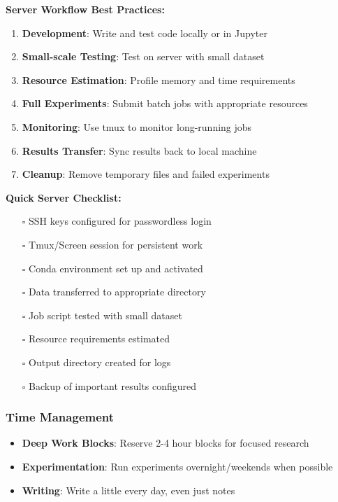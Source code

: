 \documentclass[11pt,a4paper]{article}
\begin{document}
\textbf{Server Workflow Best Practices:}

\begin{tcolorbox}[colback=green!5,colframe=green!50,title={\faLightbulb~Recommended Workflow}]
\begin{enumerate}
    \item \textbf{Development}: Write and test code locally or in Jupyter
    \item \textbf{Small-scale Testing}: Test on server with small dataset
    \item \textbf{Resource Estimation}: Profile memory and time requirements
    \item \textbf{Full Experiments}: Submit batch jobs with appropriate resources
    \item \textbf{Monitoring}: Use tmux to monitor long-running jobs
    \item \textbf{Results Transfer}: Sync results back to local machine
    \item \textbf{Cleanup}: Remove temporary files and failed experiments
\end{enumerate}
\end{tcolorbox}

\textbf{Quick Server Checklist:}

\begin{itemize}
    \item[$\square$] SSH keys configured for passwordless login
    \item[$\square$] Tmux/Screen session for persistent work
    \item[$\square$] Conda environment set up and activated
    \item[$\square$] Data transferred to appropriate directory
    \item[$\square$] Job script tested with small dataset
    \item[$\square$] Resource requirements estimated
    \item[$\square$] Output directory created for logs
    \item[$\square$] Backup of important results configured
\end{itemize}

\subsubsection{Time Management}
\begin{itemize}
    \item \textbf{Deep Work Blocks}: Reserve 2-4 hour blocks for focused research
    \item \textbf{Experimentation}: Run experiments overnight/weekends when possible
    \item \textbf{Writing}: Write a little every day, even just notes
\end{itemize}
\end{document}
